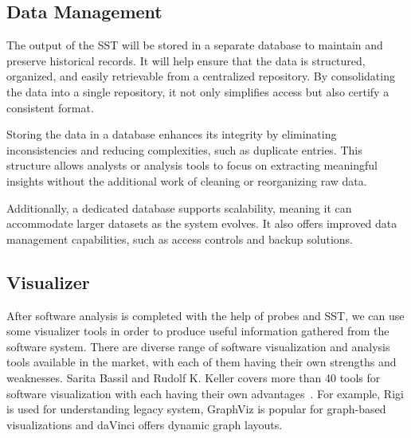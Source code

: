 \subsection{Data Management}

The output of the SST will be stored in a separate database to maintain and preserve historical records. It will help ensure that the data is structured, organized, and easily retrievable from a centralized repository. By consolidating the data into a single repository, it not only simplifies access but also certify a consistent format. 

Storing the data in a database enhances its integrity by eliminating inconsistencies and reducing complexities, such as duplicate entries. This structure allows analysts or analysis tools to focus on extracting meaningful insights without the additional work of cleaning or reorganizing raw data.

Additionally, a dedicated database supports scalability, meaning it can accommodate larger datasets as the system evolves. It also offers improved data management capabilities, such as access controls and backup solutions.

\subsection{Visualizer}\label{sec:component-visualizer}

After software analysis is completed with the help of probes and SST, we can use some visualizer tools in order to produce useful information gathered from the software system. There are diverse range of software visualization and analysis tools available in the market, with each of them having their own strengths and weaknesses. Sarita Bassil and Rudolf K. Keller covers more than 40 tools for software visualization with each having their own advantages~\citep{SWVizTools2001}. For example, Rigi is used for understanding legacy system, GraphViz is popular for graph-based visualizations and daVinci offers dynamic graph layouts.

